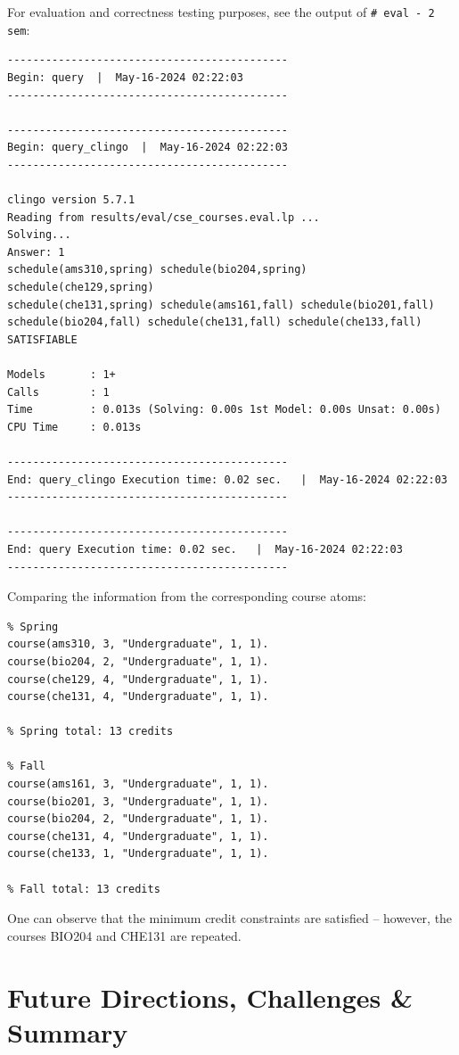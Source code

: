 \documentclass[12pt]{article}
\begin{document}
    For evaluation and correctness testing purposes, see the output of {\tt{\# eval - 2 sem}}:

    \begin{lstlisting}
--------------------------------------------
Begin: query  |  May-16-2024 02:22:03
--------------------------------------------

--------------------------------------------
Begin: query_clingo  |  May-16-2024 02:22:03
--------------------------------------------

clingo version 5.7.1
Reading from results/eval/cse_courses.eval.lp ...
Solving...
Answer: 1
schedule(ams310,spring) schedule(bio204,spring) schedule(che129,spring) 
schedule(che131,spring) schedule(ams161,fall) schedule(bio201,fall) 
schedule(bio204,fall) schedule(che131,fall) schedule(che133,fall)
SATISFIABLE

Models       : 1+
Calls        : 1
Time         : 0.013s (Solving: 0.00s 1st Model: 0.00s Unsat: 0.00s)
CPU Time     : 0.013s

--------------------------------------------
End: query_clingo Execution time: 0.02 sec.   |  May-16-2024 02:22:03
--------------------------------------------

--------------------------------------------
End: query Execution time: 0.02 sec.   |  May-16-2024 02:22:03
--------------------------------------------
    \end{lstlisting}

    Comparing the information from the corresponding course atoms:

    \begin{lstlisting}
% Spring
course(ams310, 3, "Undergraduate", 1, 1).
course(bio204, 2, "Undergraduate", 1, 1).
course(che129, 4, "Undergraduate", 1, 1).
course(che131, 4, "Undergraduate", 1, 1).

% Spring total: 13 credits

% Fall
course(ams161, 3, "Undergraduate", 1, 1).
course(bio201, 3, "Undergraduate", 1, 1).
course(bio204, 2, "Undergraduate", 1, 1).
course(che131, 4, "Undergraduate", 1, 1).
course(che133, 1, "Undergraduate", 1, 1).

% Fall total: 13 credits
    \end{lstlisting}

One can observe that the minimum credit constraints are satisfied -- however, the courses BIO204 and CHE131 are repeated.

    \section{Future Directions, Challenges \& Summary}
    \label{sec:chall-summ}
\end{document}
